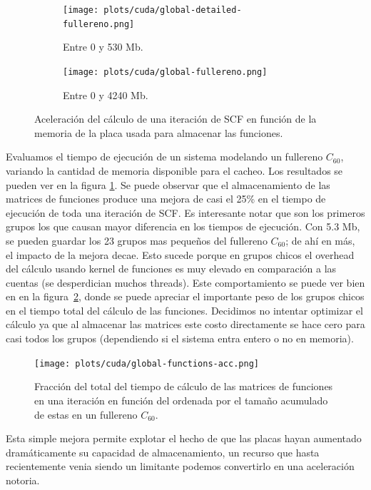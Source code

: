 \begin{figure}[htbp]
   \centering
   \begin{subfigure}[b]{\plotwidthtres}
     \texttt{[image: plots/cuda/global-detailed-fullereno.png]}
     \caption{Entre 0 y 530 Mb.}
   \end{subfigure}
   \begin{subfigure}[b]{\plotwidthtres}
     \texttt{[image: plots/cuda/global-fullereno.png]}
     \caption{Entre 0 y 4240 Mb.}
   \end{subfigure}
   \caption{Aceleraci\'on del c\'alculo de una iteraci\'on de SCF en funci\'on de la memoria de
   la placa usada para almacenar las funciones.}
   \label{plt:global-fullereno}
\end{figure}

Evaluamos el tiempo de ejecuci\'on de un sistema modelando un fullereno $C_{60}$, variando la
cantidad de memoria disponible para el cacheo. Los resultados se pueden ver en la figura \ref{plt:global-fullereno}.
Se puede observar que el almacenamiento de las matrices de funciones produce una mejora de casi el 25\% en el tiempo de ejecuci\'on
de toda una iteraci\'on de SCF. Es interesante notar que son los primeros grupos los que causan mayor
diferencia en los tiempos de ejecuci\'on. Con 5.3 Mb, se pueden guardar los 23 grupos mas peque\~nos del
fullereno $C_{60}$; de ah\'i en m\'as, el impacto de la mejora decae. Esto sucede porque en grupos
chicos el overhead del c\'alculo usando kernel de funciones es muy elevado en comparaci\'on a las
cuentas (se desperdician muchos threads). Este comportamiento se puede ver
bien en en la figura~\ref{plt:runtime-functions-fullereno}, donde se puede apreciar el importante
peso de los grupos chicos en el tiempo total del c\'alculo de las funciones. Decidimos no intentar
optimizar el c\'alculo ya que al almacenar las matrices este costo directamente se hace cero para
casi todos los grupos (dependiendo si el sistema entra entero o no en memoria).

\begin{figure}[htbp]
   \centering
   \texttt{[image: plots/cuda/global-functions-acc.png]}
   \caption{Fracci\'on del total del tiempo de c\'alculo de las matrices de funciones en una iteraci\'on en funci\'on
   del ordenada por el tama\~no acumulado de estas en un fullereno $C_{60}$.}
   \label{plt:runtime-functions-fullereno}
\end{figure}

Esta simple mejora permite explotar el hecho de que las placas hayan aumentado dram\'aticamente su
capacidad de almacenamiento, un recurso que hasta recientemente venia siendo un limitante podemos
convertirlo en una aceleraci\'on notoria.

